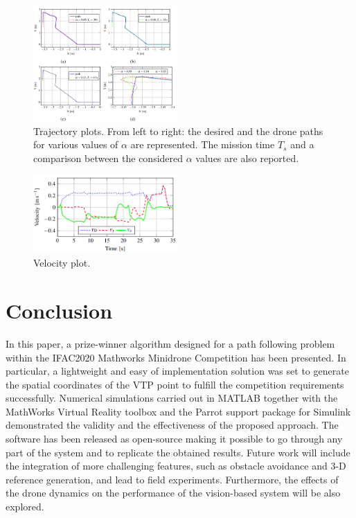 \documentclass[a4paper,twocolumn,10pt]{article}
\begin{document}
    \begin{figure}
        \centering
        \includegraphics[width=0.49\textwidth]{pics/fig10_graph.png}
        \caption{Trajectory plots. From left to right: the desired and the drone paths for various values of $\alpha$ are represented. The mission time $T_s$ and a comparison between the considered $\alpha$ values are also reported.}
        \label{fig:plot_trajectory}
    \end{figure}

    \begin{figure}
        \centering
        \includegraphics[width=0.49\textwidth]{pics/fig11_graph.png}
        \caption{Velocity plot.}
        \label{fig:plot_velocity}
    \end{figure}

    \section{Conclusion}
    \label{sec:conclusions}

    In this paper, a prize-winner algorithm designed for a path following problem within the IFAC2020 Mathworks Minidrone Competition has been presented. In particular, a lightweight and easy of implementation solution was set to generate the spatial coordinates of the VTP point to fulfill the competition requirements successfully. Numerical simulations carried out in MATLAB together with the MathWorks Virtual Reality toolbox and the Parrot support package for Simulink demonstrated the validity and the effectiveness of the proposed approach. The software has been released as open-source making it possible to go through any part of the system and to replicate the obtained results. Future work will include the integration of more challenging features, such as obstacle avoidance and 3-D reference generation, and lead to field experiments. Furthermore, the effects of the drone dynamics on the performance of the vision-based system will be also explored. 
\end{document}
